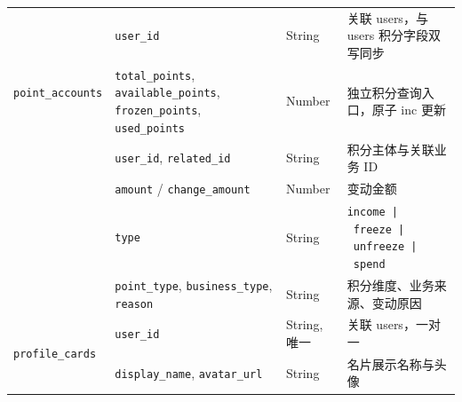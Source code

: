 \documentclass[a4paper,12pt]{article}
\begin{document}
\begin{table}[H]
{\begin{tabular}{p{2.8cm} p{3.2cm} p{2.2cm} p{5.5cm}}
      \cmidrule{2-4}
      \multirow{3}{*}{\texttt{point\_accounts}} & \texttt{user\_id}                                                                                  & String         & 关联 users，与 users 积分字段双写同步                                                                                           \\
                                                & \texttt{total\_points}, \texttt{available\_points}, \texttt{frozen\_points}, \texttt{used\_points} & Number         & 独立积分查询入口，原子 inc 更新                                                                                                  \\
      \cmidrule{2-4}
      \multirow{4}{*}{\texttt{points\_log}}     & \texttt{user\_id}, \texttt{related\_id}                                                            & String         & 积分主体与关联业务 ID                                                                                                        \\
                                                & \texttt{amount} / \texttt{change\_amount}                                                          & Number         & 变动金额                                                                                                                \\
                                                & \texttt{type}                                                                                      & String         & \texttt{income\allowbreak\ |\allowbreak\ freeze\allowbreak\ |\allowbreak\ unfreeze\allowbreak\ |\allowbreak\ spend} \\
                                                & \texttt{point\_type}, \texttt{business\_type}, \texttt{reason}                                     & String         & 积分维度、业务来源、变动原因                                                                                                      \\
      \cmidrule{2-4}
      \multirow{4}{*}{\texttt{profile\_cards}}  & \texttt{user\_id}                                                                                  & String, 唯一     & 关联 users，一对一                                                                                                        \\
                                                & \texttt{display\_name}, \texttt{avatar\_url}                                                       & String         & 名片展示名称与头像                                                                                                           \\

\end{tabular}}
\end{table}
\end{document}
